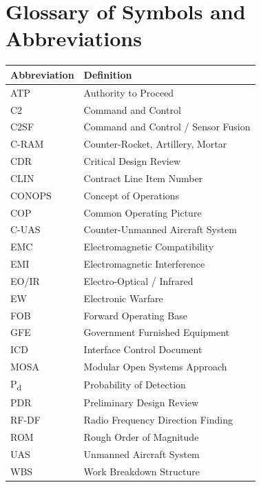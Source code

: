 \section{Glossary of Symbols and Abbreviations}

\begin{tabularx}{\linewidth}{@{}l >{\raggedright\arraybackslash}X@{}}
\toprule
\rowcolor{accentlight}
\textbf{Abbreviation} & \textbf{Definition} \\
\midrule
ATP & Authority to Proceed \\
C2 & Command and Control \\
C2SF & Command and Control / Sensor Fusion \\
C-RAM & Counter-Rocket, Artillery, Mortar \\
CDR & Critical Design Review \\
CLIN & Contract Line Item Number \\
CONOPS & Concept of Operations \\
COP & Common Operating Picture \\
C-UAS & Counter-Unmanned Aircraft System \\
EMC & Electromagnetic Compatibility \\
EMI & Electromagnetic Interference \\
EO/IR & Electro-Optical / Infrared \\
EW & Electronic Warfare \\
FOB & Forward Operating Base \\
GFE & Government Furnished Equipment \\
ICD & Interface Control Document \\
MOSA & Modular Open Systems Approach \\
P\textsubscript{d} & Probability of Detection \\
PDR & Preliminary Design Review \\
RF-DF & Radio Frequency Direction Finding \\
ROM & Rough Order of Magnitude \\
UAS & Unmanned Aircraft System \\
WBS & Work Breakdown Structure \\
\bottomrule
\end{tabularx}

\clearpage

